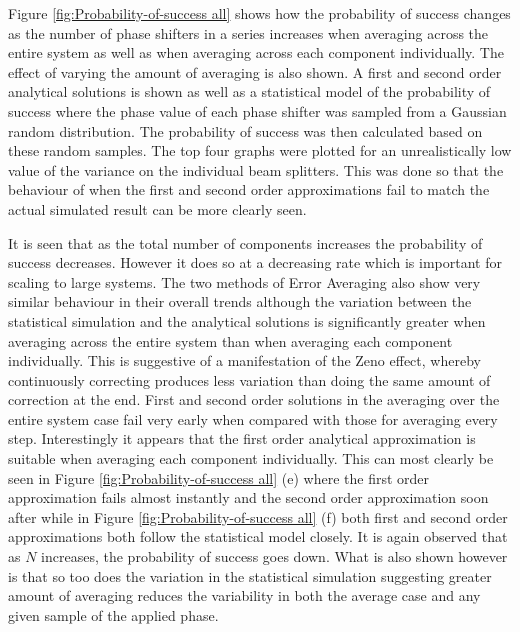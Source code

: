 \documentclass[aps,pra,twocolumn,superscriptaddress,numerical]{revtex4-1}
\begin{document}
		
		Figure \ref{fig:Probability-of-success all} shows how the probability of success changes as the number of phase shifters in a series increases when averaging across the entire system as well as when averaging across each component individually. The effect of varying the amount of averaging is also shown. A first and second order analytical solutions	is  shown as well as a statistical model of the probability of success where the phase value of each phase shifter was sampled from a Gaussian random distribution. The probability of success was then calculated based on these random samples. The top four graphs were plotted for an unrealistically low value of the variance on the individual beam splitters. This was done so that the behaviour of when the first and second order approximations fail to match the actual simulated result can be more clearly seen. 
		
		It is seen that as the total number of components increases the probability of success decreases. However it does so at a decreasing rate which is important for scaling to large systems. The two methods of Error Averaging also show very similar behaviour in their overall trends although the variation between the statistical simulation and the analytical solutions is significantly greater when averaging across the entire system than when averaging each component individually. This is suggestive of a manifestation of the Zeno effect, whereby continuously correcting produces less variation than doing the same amount of correction at the end. First and second order solutions in the averaging over the entire system case fail very early when compared with those for averaging every step. Interestingly it appears that the first order analytical approximation is suitable when averaging each component individually. This can most clearly be seen in Figure \ref{fig:Probability-of-success all} (e) where the first order approximation fails almost instantly and the second order approximation soon after while in Figure \ref{fig:Probability-of-success all} (f) both first and second order approximations both follow the statistical model closely. It is again observed that as $N$ increases, the probability of success goes down. What is also shown however is that so too does the variation in the statistical simulation suggesting greater amount of averaging reduces the variability in both the average case and any given sample of the applied phase.
		
\end{document}
